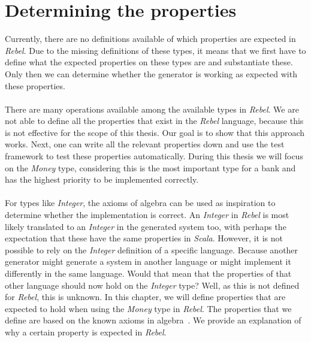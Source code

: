\section{Determining the properties}
Currently, there are no definitions available of which properties are expected
in \textit{Rebel}. Due to the missing definitions of these types, it means that
we first have to define what the expected properties
on these types are and substantiate these. Only then we can determine whether
the generator is working as expected with these properties.\\
\\
There are many operations available among the available types in \textit{Rebel}.
We are not able to define all the properties that exist in the \textit{Rebel}
language, because this is not effective for the scope of this thesis. Our goal
is to show that this approach works. Next, one can write all the relevant properties
down and use the test framework to test these properties automatically. During
this thesis we will focus on the \textit{Money} type, considering this is the
most important type for a bank and has the highest priority to be implemented
correctly.\\
\\
For types like \textit{Integer}, the axioms of algebra can be used as inspiration to determine whether
the implementation is correct. An \textit{Integer} in \textit{Rebel} is most likely translated to an \textit{Integer} in
the generated system too, with perhaps the expectation that these have the same
properties in \textit{Scala}. However, it is not possible to rely on the
\textit{Integer} definition of a specific language. Because another generator
might generate a system in another language or might implement it differently in
the same language. Would that mean that the properties of that other language
should now hold on the \textit{Integer} type? Well, as this is not defined for
\textit{Rebel}, this is unknown. In this chapter, we will define properties that
are expected to hold when using the \textit{Money} type in \textit{Rebel}. The
properties that we define are based on the known axioms in
algebra~\cite{baumgart1961axioms,raftery2011perspective,apostol2007calculus}. We
provide an explanation of why a certain property is expected in
\textit{Rebel}.\\
